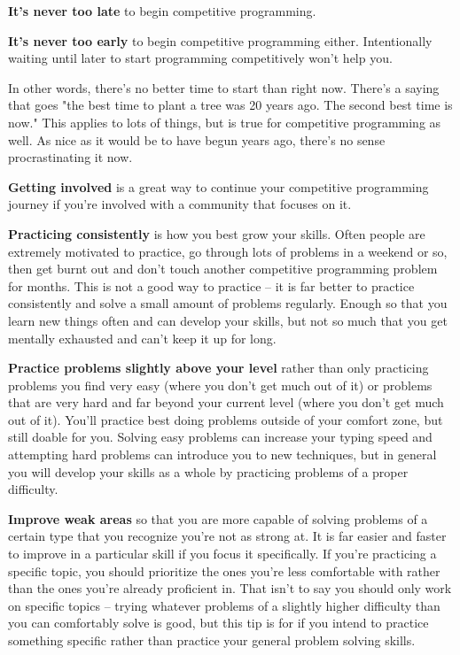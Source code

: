 \textbf{It's never too late} to begin competitive programming.

\textbf{It's never too early} to begin competitive programming either. Intentionally waiting until later to start programming competitively won't help you.

In other words, there's no better time to start than right now. There's a saying that goes "the best time to plant a tree was 20 years ago. The second best time is now." This applies to lots of things, but is true for competitive programming as well. As nice as it would be to have begun years ago, there's no sense procrastinating it now.

\textbf{Getting involved} is a great way to continue your competitive programming journey if you're involved with a community that focuses on it.

\textbf{Practicing consistently} is how you best grow your skills. Often people are extremely motivated to practice, go through lots of problems in a weekend or so, then get burnt out and don't touch another competitive programming problem for months. This is not a good way to practice -- it is far better to practice consistently and solve a small amount of problems regularly. Enough so that you learn new things often and can develop your skills, but not so much that you get mentally exhausted and can't keep it up for long.

\textbf{Practice problems slightly above your level} rather than only practicing problems you find very easy (where you don't get much out of it) or problems that are very hard and far beyond your current level (where you don't get much out of it). You'll practice best doing problems outside of your comfort zone, but still doable for you. Solving easy problems can increase your typing speed and attempting hard problems can introduce you to new techniques, but in general you will develop your skills as a whole by practicing problems of a proper difficulty.

\textbf{Improve weak areas} so that you are more capable of solving problems of a certain type that you recognize you're not as strong at. It is far easier and faster to improve in a particular skill if you focus it specifically. If you're practicing a specific topic, you should prioritize the ones you're less comfortable with rather than the ones you're already proficient in. That isn't to say you should only work on specific topics -- trying whatever problems of a slightly higher difficulty than you can comfortably solve is good, but this tip is for if you intend to practice something specific rather than practice your general problem solving skills.

